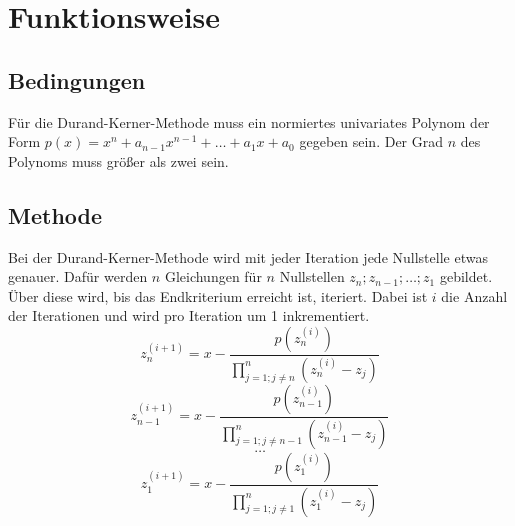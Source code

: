 \documentclass[12pt]{article}
\begin{document}
\section{Funktionsweise}
\subsection{Bedingungen}
Für die Durand-Kerner-Methode muss ein normiertes univariates Polynom der Form $p(x) = x^n + a_{n-1} x^{n-1} + \dots + a_1 x + a_0$ gegeben sein. Der Grad $n$ des Polynoms muss größer als zwei sein.

\subsection{Methode}
Bei der Durand-Kerner-Methode wird mit jeder Iteration jede Nullstelle etwas genauer. Dafür werden $n$ Gleichungen für $n$ Nullstellen $z_n;z_{n-1};\dots;z_1$ gebildet. Über diese wird, bis das Endkriterium erreicht ist, iteriert. Dabei ist $i$ die Anzahl der Iterationen und wird pro Iteration um 1 inkrementiert.
\[z_n^{(i+1)} = x - \frac{p(z_n^{(i)})}{\prod_{j=1;j\neq n}^{n}(z_n^{(i)}-z_j)}\]
\[z_{n-1}^{(i+1)} = x - \frac{p(z_{n-1}^{(i)})}{\prod_{j=1;j\neq n-1}^{n}(z_{n-1}^{(i)}-z_j)}\]
\vspace{0.25mm}
\[\dots\]
\[z_{1}^{(i+1)} = x - \frac{p(z_{1}^{(i)})}{\prod_{j=1;j\neq 1}^{n}(z_{1}^{(i)}-z_j)}\]
\end{document}
